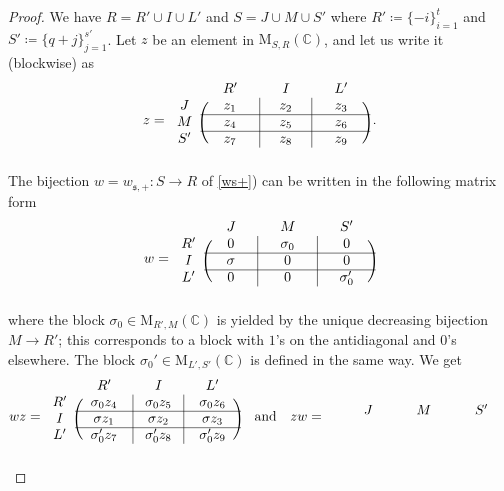 \documentclass[11pt]{article}
\theoremstyle{definition}
\numberwithin{equation}{section}
\newcommand{\fs}{\mathfrak{s}}
\newcommand{\Mat}{\mathrm{M}}
\newcommand{\mC}{\mathbb{C}}
\begin{document}
\begin{proof}
We have $R=R'\cup I\cup L'$ and $S=J\cup M\cup S'$ where $R'\coloneqq \{-i\}_{i=1}^t$
and $S'\coloneqq \{q+j\}_{j=1}^{s'}$.
Let $z$ be an element in $\Mat_{S,R}(\mC)$, and let us write it (blockwise) as
\begin{equation}
\label{z}
z=\begin{blockarray}{cccc}
{} & {\quad R'\quad} & {\quad I\quad} & {\quad L'\quad}\\
\begin{block}{c(c|c|c)}
J & z_1 & z_2 & z_3\\
\cline{2-4}
M & z_4 & z_5 & z_6\\
\cline{2-4}
S' & z_7 & z_8 & z_9\\
\end{block}
\end{blockarray}\,.\end{equation}
The bijection $w=w_{\fs,+}:S\to R$ of \eqref{ws+}) can be written in the following matrix form
\[
w=\begin{blockarray}{cccc}
{} & {\quad J\quad} & {\quad M\quad} & {\quad S'\quad}\\
\begin{block}{c(c|c|c)}
R' & 0 & \sigma_0 & 0\\
\cline{2-4}
I & \sigma & 0 & 0\\
\cline{2-4}
L' & 0 & 0 & \sigma_0'\\
\end{block}
\end{blockarray}
\]
where the block $\sigma_0\in\Mat_{R',M}(\mC)$ is yielded by the unique decreasing bijection $M\to R'$; this corresponds to a block with $1$'s on the antidiagonal and $0$'s elsewhere. The block $\sigma_0'\in\Mat_{L',S'}(\mC)$ is defined in the same way.
We get
\[ wz=\begin{blockarray}{cccc}
{} & {\quad R'\quad} & {\quad I\quad} & {\quad L'\quad}\\
\begin{block}{c(c|c|c)}
R' & \sigma_0 z_4 & \sigma_0 z_5 & \sigma_0 z_6\\
\cline{2-4}
I & \sigma z_1 & \sigma z_2 & \sigma z_3\\
\cline{2-4}
L' & \sigma_0' z_7 & \sigma_0' z_8 & \sigma_0' z_9\\
\end{block}
\end{blockarray} \quad
\mbox{and}\quad
zw=\begin{blockarray}{cccc}
{} & {\quad J\quad} & {\quad M\quad} & {\quad S'\quad}\\

\end{blockarray}\]
\end{proof}
\end{document}
